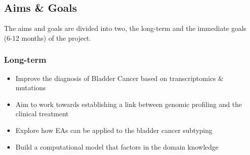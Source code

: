 



\subsection{Aims \& Goals} \label{s:aims}

The aims and goals are divided into two, the long-term and the immediate goals (6-12 months) of the project.

\subsubsection*{Long-term}
\begin{itemize} 
    \item Improve the diagnosis of Bladder Cancer based on transcriptomics \& mutations 
    \item Aim to work towards establishing a link between genomic profiling and the clinical treatment 
    \item Explore how EAs can be applied to the bladder cancer subtyping 
    \item Build a computational model that factors in the domain knowledge
\end{itemize}



